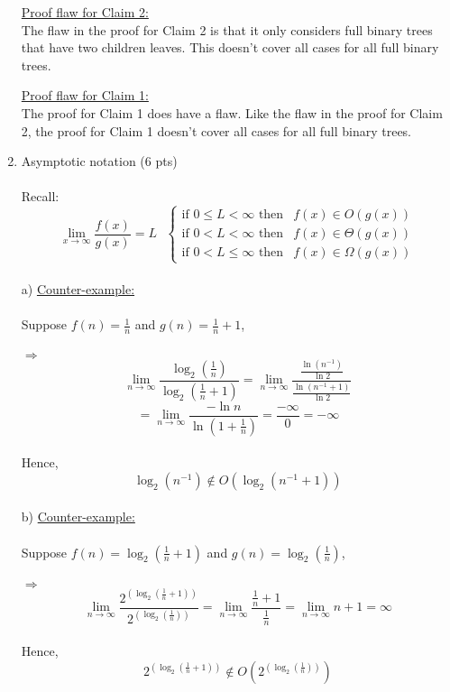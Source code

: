 \documentclass[11pt]{article}
\begin{document}
\begin{enumerate}
\underline{Proof flaw for Claim 2:}\\
The flaw in the proof for Claim 2 is that it only considers full binary trees that have two children leaves. This doesn't cover all cases for all full binary trees.

\underline{Proof flaw for Claim 1:}\\
The proof for Claim 1 does have a flaw. Like the flaw in the proof for Claim 2, the proof for Claim 1 doesn't cover all cases for all full binary trees. 

\item Asymptotic notation (6 pts)\\
\- \\
Recall: \[ \lim_{x\to\infty} \frac{f(x)}{g(x)} = L \text{  }\begin{cases} \text{if } 0 \leq L < \infty \text{ then}&f(x) \in O(g(x))\\ \text{if } 0<L<\infty \text{ then}&f(x) \in \Theta(g(x))\\ \text{if } 0<L\leq \infty \text{ then}&f(x) \in \Omega(g(x))\end{cases}\]\\
a) \underline{Counter-example:}\\
\- \\
\phantom{b) } Suppose ${f(n) = \frac{1}{n}}$ and ${g(n) = \frac{1}{n} + 1}$,\\
\- \\
\phantom{b) } ${\Rightarrow}$ $$\lim_{n\to\infty} \frac{\log_2{(\frac{1}{n})}}{\log_2{(\frac{1}{n} + 1)}} = \lim_{n\to\infty} \frac{\frac{\ln (n^{-1})}{\ln 2}}{\frac{\ln (n^{-1} + 1)}{\ln 2}}$$  $$= \lim_{n\to\infty} \frac{-\ln n}{\ln (1+\frac{1}{n})} = \frac{-\infty}{0} = -\infty$$\\
\phantom{b) } Hence, $$\log_2{(n^{-1})} \not\in O(\log_2{(n^{-1} + 1)})$$\\

b) \underline{Counter-example:}\\
\- \\
\phantom{b) } Suppose ${f(n) = \log_2{(\frac{1}{n}+1)}}$ and ${g(n) =\log_2{(\frac{1}{n})}}$,\\
\- \\
\phantom{b) } ${\Rightarrow}$ $$\lim_{n\to\infty} \frac{2^{(\log_2{(\frac{1}{n}+1)})}}{2^{(\log_2{(\frac{1}{n})})}} =\lim_{n\to\infty}  \frac{\frac{1}{n}+1}{\frac{1}{n}} = \lim_{n\to\infty} n+1 = \infty$$\\
\phantom{b) } Hence, $$2^{(\log_2{(\frac{1}{n}+1)})} \not\in O(2^{(\log_2{(\frac{1}{n})})})$$\\


\end{enumerate}
\end{document}
